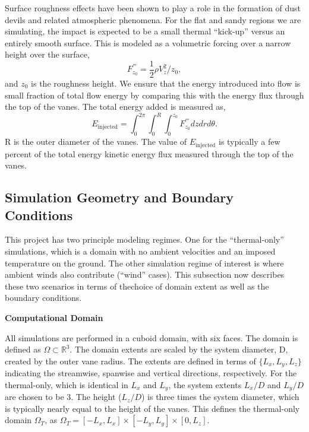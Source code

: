 Surface roughness effects have been shown to play a role in the
formation of dust devils and related atmospheric
phenomena\cite{oke1987boundary}. For the flat and sandy regions we are
simulating, the impact is expected to be a small thermal ``kick-up''
versus an entirely smooth surface. This is modeled as a volumetric 
forcing over a narrow height over the surface, 
\begin{equation}
 F^{'''}_{z_0} = \frac{1}{2}\rho V_z^2/z_{0}, 
\end{equation}
and $z_{0}$ is the roughness height. We ensure that the energy
introduced into flow is small fraction of total flow energy by comparing
this with the energy flux through the top of the vanes. The total energy
added is measured as,  
\begin{equation}
 E_{\text{injected}} = \int_0^{2\pi} \int_0^R \int_0^{z_0} F^{'''}_{z_0}
  dz dr d\theta.  
\end{equation}
R is the outer diameter of the vanes. 
The value of $E_{\text{injected}}$ is typically a few percent of the
total energy kinetic energy flux measured through the top of the
vanes.


\subsection{Simulation Geometry and Boundary Conditions}
\label{sec:bc}

This project has two principle modeling regimes. One for the
``thermal-only'' simulations,  which is a domain with no ambient
velocities and an imposed temperature on the ground.  The other
simulation regime of interest is where ambient winds also contribute
(``wind'' cases). This subsection now describes these two scenarios 
in terms of thechoice of domain extent as well as the boundary conditions. 

\textbf{Computational Domain} 

All simulations are performed in a cuboid domain, with six
faces.  The domain is defined as $\Omega \subset \mathbb{R}^3$. 
The domain extents are scaled by the system diameter, D, created by the
outer vane radius.  
The extents are defined in terms of $\{L_x,L_y,L_z\}$ indicating the 
streamwise, spanwise and vertical directions, respectively. 
For the thermal-only, which is identical in $L_x$ and $L_y$, the system
extents $L_x/D$ and $L_y/D$ are chosen to be 3. The height ($L_z/D$) is
three times the system diameter, which is typically nearly equal to the
height of the vanes. This defines the thermal-only domain $\Omega_T$, 
as $\Omega_T = \left[-L_x,L_x \right] \times \left[-L_y,L_y \right]
\times \left[0,L_z \right]$.   

